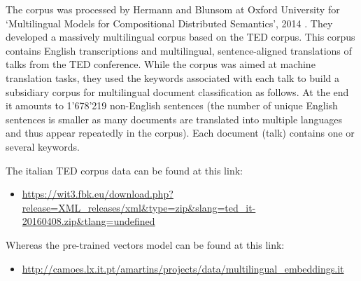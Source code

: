 The corpus was processed by Hermann and Blunsom at Oxford University for \enquote*{Multilingual Models for Compositional Distributed Semantics}, 2014 \cite{hermann2014multilingual}. They developed a massively multilingual corpus based on the TED corpus. This corpus contains English transcriptions and multilingual, sentence-aligned translations of talks from the TED conference.
While the corpus was aimed at machine translation tasks, they used the keywords associated with each talk to build a subsidiary corpus for multilingual document classification as follows.
At the end it amounts to 1'678'219 non-English sentences (the number of unique English sentences is smaller as many documents are translated into multiple languages and thus appear repeatedly in the corpus). Each document (talk) contains one or several keywords.


The italian TED corpus data can be found at this link:
\begin{itemize}
	\item \url{https://wit3.fbk.eu/download.php?release=XML_releases/xml\&type=zip\&slang=ted_it-20160408.zip\&tlang=undefined}
\end{itemize}
Whereas the pre-trained vectors model can be found at this link:
\begin{itemize}
	\item \url{http://camoes.lx.it.pt/amartins/projects/data/multilingual_embeddings.it}
\end{itemize}
